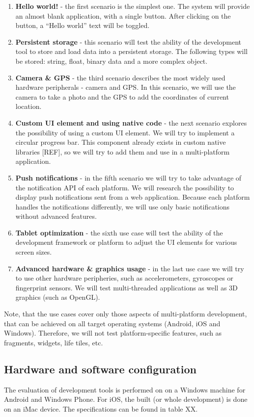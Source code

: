 \documentclass[english,master,public,dept460,male,cpdeclaration,oneside]{diploma}
\begin{document}
\begin{enumerate}
	\item \textbf{Hello world! }- the first scenario is the simplest one. The system will provide an almost blank application, with a single button. After clicking on the button, a “Hello world” text will be toggled.
	\item \textbf{Persistent storage }- this scenario will test the ability of the development tool to store and load data into a persistent storage. The following types will be stored: string, float, binary data and a more complex object.
	\item \textbf{Camera \& GPS }- the third scenario describes the most widely used hardware peripherals - camera and GPS. In this scenario, we will use the camera to take a photo and the GPS to add the coordinates of current location.
	\item \textbf{Custom UI element and using native code }- the next scenario explores the possibility of using a custom UI element. We will try to implement a circular progress bar. This component already exists in custom native libraries [REF], so we will try to add them and use in a multi-platform application.
	\item \textbf{Push notifications }- in the fifth scenario we will try to take advantage of the notification API of each platform. We will research the possibility to display push notifications sent from a web application. Because each platform handles the notifications differently, we will use only basic notifications without advanced features.
	\item \textbf{Tablet optimization} - the sixth use case will test the ability of the development framework or platform to adjust the UI elements for various screen sizes.
	\item \textbf{Advanced hardware \& graphics usage }- in the last use case we will try to use other hardware peripheries, such as accelerometers, gyroscopes or fingerprint sensors. We will test multi-threaded applications as well as 3D graphics (such as OpenGL).
\end{enumerate}

Note, that the use cases cover only those aspects of multi-platform development, that can be achieved on all target operating systems (Android, iOS and Windows). Therefore, we will not test platform-specific features, such as fragments, widgets, life tiles, etc.

\subsection{Hardware and software configuration}
The evaluation of development tools is performed on on a Windows machine for Android and Windows Phone. For iOS, the built (or whole development) is done on an iMac device. The specifications can be found in table XX.
\end{document}
